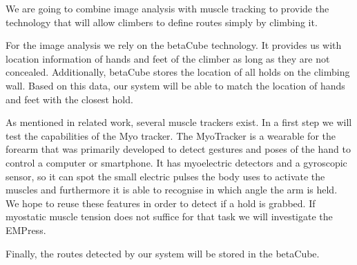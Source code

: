 We are going to combine image analysis with muscle tracking to provide the technology that will allow climbers to define routes simply by climbing it.

For the image analysis we rely on the betaCube technology.
It provides us with location information of hands and feet of the climber as long as they are not concealed.
Additionally, betaCube stores the location of all holds on the climbing wall.
Based on this data, our system will be able to match the location of hands and feet with the closest hold.

As mentioned in related work, several muscle trackers exist.
In a first step we will test the capabilities of the Myo tracker.
The MyoTracker is a wearable for the forearm that was primarily developed to detect gestures and poses of the hand to control a computer or smartphone.
It has myoelectric detectors and a gyroscopic sensor, so it can spot the small electric pulses the body uses to activate the muscles and furthermore it is able to recognise in which angle the arm is held.
We hope to reuse these features in order to detect if a hold is grabbed.
If myostatic muscle tension does not suffice for that task we will investigate the EMPress.

Finally, the routes detected by our system will be stored in the betaCube.

